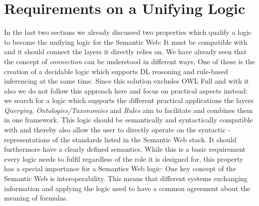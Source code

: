 \section{Requirements on a Unifying Logic}\label{req}
In the last two sections we already discussed two properties which qualify a logic to become the unifying logic for the Semantic Web: It must be compatible with \rdf and it should 
 connect the layers it directly relies on. We have already seen that the concept of \emph{connection} can be understood in different ways. One of these is the creation of a 
 decidable logic which supports DL reasoning and rule-based inferencing at the same time. Since this solution excludes OWL Full and with it also \rdf we do not follow this approach here 
 and focus on practical aspects instead: we search for a logic which supports the different practical applications the layers \emph{Querying}, \emph{Ontologies/Taxonomies} and 
 \emph{Rules} aim to facilitate and combines them in one framework. This logic should be semantically and syntactically compatible with \rdf and
 thereby also allow the user to directly operate 
 on the syntactic \rdf-representations 
 of the standards listed in the Semantic Web stack. It should furthermore have a clearly defined semantics. While this is a basic requirement every logic needs to fulfil 
 regardless of the role it is designed for, this property has a special importance for a Semantics Web logic: One key concept of 
the Semantic Web is interoperability. This means that different systems exchanging information and applying the logic need to have a common agreement about 
the meaning of formulas.
 
